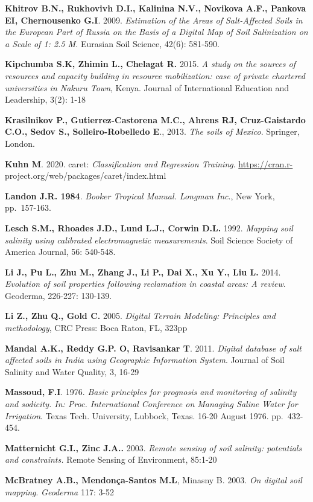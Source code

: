 \documentclass[
  10pt,
  b5paper,
]{book}
\begin{document}
\textbf{Khitrov B.N., Rukhovivh D.I., Kalinina N.V., Novikova A.F., Pankova EI, Chernousenko G.I}. 2009. \emph{Estimation of the Areas of Salt-Affected Soils in the European Part of Russia on the Basis of a Digital Map of Soil Salinization on a Scale of 1: 2.5 M.} Eurasian Soil Science, 42(6): 581-590.

\textbf{Kipchumba S.K, Zhimin L., Chelagat R.} 2015. \emph{A study on the sources of resources and capacity building in resource mobilization: case of private chartered universities in Nakuru Town}, Kenya. Journal of International Education and Leadership, 3(2): 1-18

\textbf{Krasilnikov P., Gutierrez-Castorena M.C., Ahrens RJ, Cruz-Gaistardo C.O., Sedov S., Solleiro-Robelledo E}., 2013. \emph{The soils of Mexico}. Springer, London.

\textbf{Kuhn M}. 2020. caret: \emph{Classification and Regression Training}. \url{https://cran.r-} project.org/web/packages/caret/index.html

\textbf{Landon J.R. 1984}. \emph{Booker Tropical Manual. Longman Inc}., New York, pp.~157-163.

\textbf{Lesch S.M., Rhoades J.D., Lund L.J., Corwin D.L.} 1992. \emph{Mapping soil salinity using calibrated electromagnetic measurements}. Soil Science Society of America Journal, 56: 540-548.

\textbf{Li J., Pu L., Zhu M., Zhang J., Li P., Dai X., Xu Y., Liu L.} 2014. \emph{Evolution of soil properties following reclamation in coastal areas: A review}. Geoderma, 226-227: 130-139.

\textbf{Li Z., Zhu Q., Gold C.} 2005. \emph{Digital Terrain Modeling: Principles and methodology}, CRC Press: Boca Raton, FL, 323pp

\textbf{Mandal A.K., Reddy G.P. O, Ravisankar T}. 2011. \emph{Digital database of salt affected soils in India using Geographic Information System}. Journal of Soil Salinity and Water Quality, 3, 16-29

\textbf{Massoud, F.I}. 1976. \emph{Basic principles for prognosis and monitoring of salinity and sodicity. In: Proc. International Conference on Managing Saline Water for Irrigation}. Texas Tech. University, Lubbock, Texas. 16-20 August 1976. pp.~432-454.

\textbf{Matternicht G.I., Zinc J.A..} 2003. \emph{Remote sensing of soil salinity: potentials and constraints.} Remote Sensing of Environment, 85:1-20

\textbf{McBratney A.B., Mendon\c{c}a-Santos M.L}, Minasny B. 2003. \emph{On digital soil mapping}. \emph{Geoderma} 117: 3-52
\end{document}
